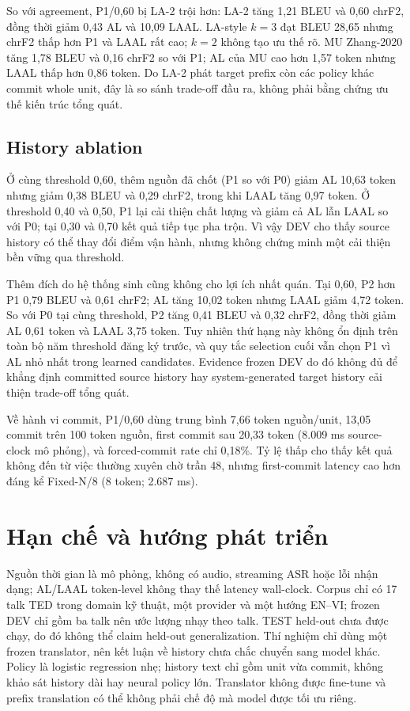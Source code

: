 \documentclass[conference]{IEEEtran}
\begin{document}
So với agreement, P1/0,60 bị LA-2 trội hơn: LA-2 tăng 1,21 BLEU và 0,60 chrF2, đồng thời giảm 0,43 AL và 10,09 LAAL. LA-style $k=3$ đạt BLEU 28,65 nhưng chrF2 thấp hơn P1 và LAAL rất cao; $k=2$ không tạo ưu thế rõ. MU Zhang-2020 tăng 1,78 BLEU và 0,16 chrF2 so với P1; AL của MU cao hơn 1,57 token nhưng LAAL thấp hơn 0,86 token. Do LA-2 phát target prefix còn các policy khác commit whole unit, đây là so sánh trade-off đầu ra, không phải bằng chứng ưu thế kiến trúc tổng quát.

\subsection{History ablation}
Ở cùng threshold 0,60, thêm nguồn đã chốt (P1 so với P0) giảm AL 10,63 token nhưng giảm 0,38 BLEU và 0,29 chrF2, trong khi LAAL tăng 0,97 token. Ở threshold 0,40 và 0,50, P1 lại cải thiện chất lượng và giảm cả AL lẫn LAAL so với P0; tại 0,30 và 0,70 kết quả tiếp tục pha trộn. Vì vậy DEV cho thấy source history có thể thay đổi điểm vận hành, nhưng không chứng minh một cải thiện bền vững qua threshold.

Thêm đích do hệ thống sinh cũng không cho lợi ích nhất quán. Tại 0,60, P2 hơn P1 0,79 BLEU và 0,61 chrF2; AL tăng 10,02 token nhưng LAAL giảm 4,72 token. So với P0 tại cùng threshold, P2 tăng 0,41 BLEU và 0,32 chrF2, đồng thời giảm AL 0,61 token và LAAL 3,75 token. Tuy nhiên thứ hạng này không ổn định trên toàn bộ năm threshold đăng ký trước, và quy tắc selection cuối vẫn chọn P1 vì AL nhỏ nhất trong learned candidates. Evidence frozen DEV do đó không đủ để khẳng định committed source history hay system-generated target history cải thiện trade-off tổng quát.

Về hành vi commit, P1/0,60 dùng trung bình 7,66 token nguồn/unit, 13,05 commit trên 100 token nguồn, first commit sau 20,33 token (8.009 ms source-clock mô phỏng), và forced-commit rate chỉ 0,18\%. Tỷ lệ thấp cho thấy kết quả không đến từ việc thường xuyên chờ trần 48, nhưng first-commit latency cao hơn đáng kể Fixed-N/8 (8 token; 2.687 ms).

\section{Hạn chế và hướng phát triển}
Nguồn thời gian là mô phỏng, không có audio, streaming ASR hoặc lỗi nhận dạng; AL/LAAL token-level không thay thế latency wall-clock. Corpus chỉ có 17 talk TED trong domain kỹ thuật, một provider và một hướng EN--VI; frozen DEV chỉ gồm ba talk nên ước lượng nhạy theo talk. TEST held-out chưa được chạy, do đó không thể claim held-out generalization. Thí nghiệm chỉ dùng một frozen translator, nên kết luận về history chưa chắc chuyển sang model khác. Policy là logistic regression nhẹ; history text chỉ gồm unit vừa commit, không khảo sát history dài hay neural policy lớn. Translator không được fine-tune và prefix translation có thể không phải chế độ mà model được tối ưu riêng.
\end{document}
